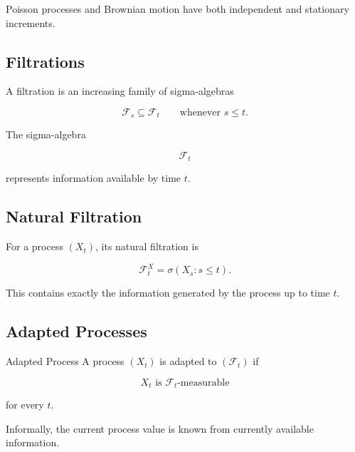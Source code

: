 Poisson processes and Brownian motion have both independent and
stationary increments.

\subsection{Filtrations}
\label{subsec:filtrations-processes}

A filtration is an increasing family of sigma-algebras

\[
\boxed{
\mathcal{F}_s
\subseteq
\mathcal{F}_t
\qquad
\text{whenever }s\leq t.
}
\]

The sigma-algebra

\[
\mathcal{F}_t
\]

represents information available by time \(t\).

\subsection{Natural Filtration}
\label{subsec:natural-filtration}

For a process \((X_t)\), its natural filtration is

\[
\boxed{
\mathcal{F}_t^X
=
\sigma(X_s:s\leq t).
}
\]

This contains exactly the information generated by the process up to
time \(t\).

\subsection{Adapted Processes}
\label{subsec:adapted-processes}

\begin{definitionbox}{Adapted Process}
A process \((X_t)\) is adapted to \((\mathcal{F}_t)\) if

\[
\boxed{
X_t
\text{ is }
\mathcal{F}_t\text{-measurable}
}
\]

for every \(t\).
\end{definitionbox}

Informally, the current process value is known from currently available
information.


